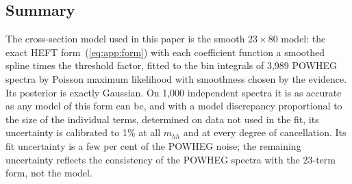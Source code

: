 \subsection{Summary}
\label{app:summary}

The cross-section model used in this paper is the smooth $23\times80$ model: the exact HEFT
form~(\ref{eq:app:form}) with each coefficient function a smoothed spline times the threshold factor,
fitted to the bin integrals of 3,989 POWHEG spectra by Poisson maximum likelihood with smoothness chosen
by the evidence. Its posterior is exactly Gaussian. On 1,000 independent spectra it is as accurate as any
model of this form can be, and with a model discrepancy proportional to the size of the individual terms,
determined on data not used in the fit, its uncertainty is calibrated to 1\% at all $m_{hh}$ and at every
degree of cancellation. Its fit uncertainty is a few per cent of the POWHEG noise; the remaining
uncertainty reflects the consistency of the POWHEG spectra with the 23-term form, not the model.
